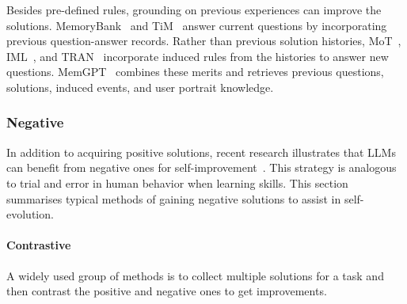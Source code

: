 \documentclass[sn-basic, Numbered]{sn-jnl}%
\theoremstyle{thmstyleone}%
\theoremstyle{thmstyletwo}%
\theoremstyle{thmstylethree}%
\begin{document}
Besides pre-defined rules, grounding on previous experiences can improve the solutions.
MemoryBank~\cite{zhong2024memorybank} and TiM~\cite{liu2023think} answer current questions by incorporating previous question-answer records.
Rather than previous solution histories, MoT~\cite{li2023mot}, IML~\cite{wang2024memory}, and TRAN~\cite{yang2023failures} incorporate induced rules from the histories to answer new questions. 
MemGPT~\cite{packer2023memgpt} combines these merits and retrieves previous questions, solutions, induced events, and user portrait knowledge.




\subsubsection{Negative}
In addition to acquiring positive solutions, recent research illustrates that LLMs can benefit from negative ones for self-improvement~\cite{yang2023failures}.
This strategy is analogous to trial and error in human behavior when learning skills. This section summarises typical methods of gaining negative solutions to assist in self-evolution. 

\noindent\paragraph{Contrastive} 
A widely used group of methods is to collect multiple solutions for a task and then contrast the positive and negative ones to get improvements.

\end{document}
